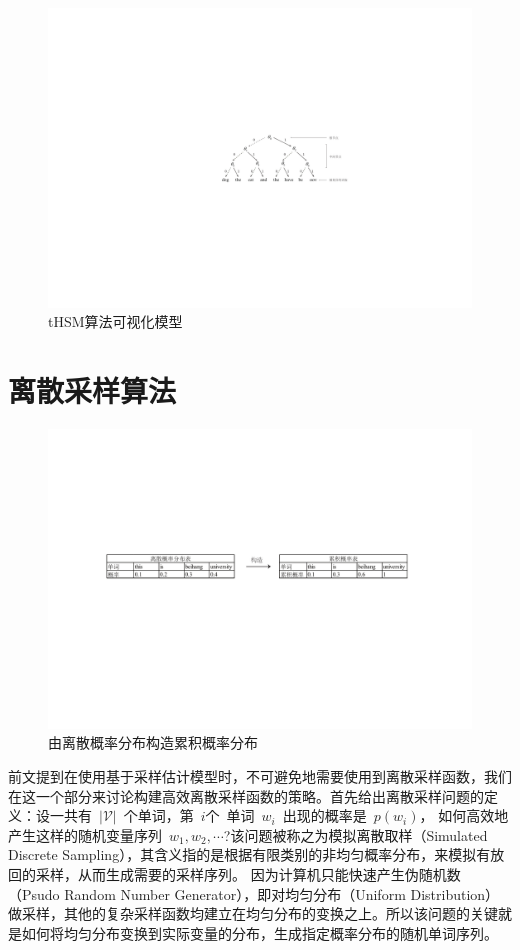 \begin{figure}[!t]
  \centering
\includegraphics[width=.85\linewidth]{./figures/thsm-example.pdf}
\caption{tHSM算法可视化模型}\label{fig:case_thsm}
\end{figure}

\section{离散采样算法}
\begin{figure}[!t]
  \centering
\includegraphics[width=1\linewidth]{./figures/cdfreverse.pdf}
\caption{由离散概率分布构造累积概率分布}\label{fig:cdf_reverse}
\end{figure}

前文提到在使用基于采样估计模型时，不可避免地需要使用到离散采样函数，我们在这一个部分来讨论构建高效离散采样函数的策略。首先给出离散采样问题的定义：设一共有~$|\mathcal{V}|$~个单词，第~$i$个~单词~$w_i$~出现的概率是~$p(w_i)$， 如何高效地产生这样的随机变量序列~$w_1,w_2,\cdots$?该问题被称之为模拟离散取样（Simulated Discrete Sampling），其含义指的是根据有限类别的非均匀概率分布，来模拟有放回的采样，从而生成需要的采样序列。
因为计算机只能快速产生伪随机数（Psudo Random Number Generator），即对均匀分布（Uniform Distribution）做采样，其他的复杂采样函数均建立在均匀分布的变换之上。所以该问题的关键就是如何将均匀分布变换到实际变量的分布，生成指定概率分布的随机单词序列。

